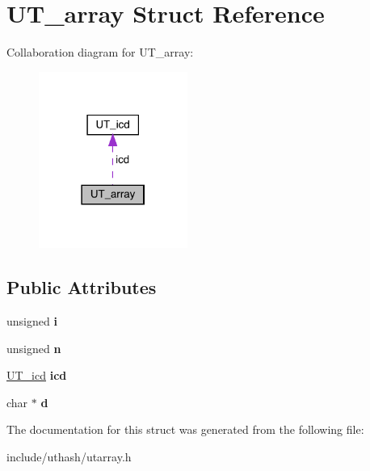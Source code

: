 \hypertarget{struct_u_t__array}{}\section{U\+T\+\_\+array Struct Reference}
\label{struct_u_t__array}


Collaboration diagram for U\+T\+\_\+array\+:\nopagebreak
\begin{figure}[H]
\begin{center}
\leavevmode
\includegraphics[width=138pt]{struct_u_t__array__coll__graph}
\end{center}
\end{figure}
\subsection*{Public Attributes}
\begin{DoxyCompactItemize}
\item 
\mbox{\label{struct_u_t__array_add4a738223f032481193cc5901cef56e}} 
unsigned {\bfseries i}
\item 
\mbox{\label{struct_u_t__array_a48798687ef8b6a5ba3fbe806520c5824}} 
unsigned {\bfseries n}
\item 
\mbox{\label{struct_u_t__array_a8308fc1e930b18b9561e713fd13e5997}} 
\mbox{\hyperlink{struct_u_t__icd}{U\+T\+\_\+icd}} {\bfseries icd}
\item 
\mbox{\label{struct_u_t__array_aab8159eaea37e87d0af22c97758c7b77}} 
char $\ast$ {\bfseries d}
\end{DoxyCompactItemize}


The documentation for this struct was generated from the following file\+:\begin{DoxyCompactItemize}
\item 
include/uthash/utarray.\+h\end{DoxyCompactItemize}
